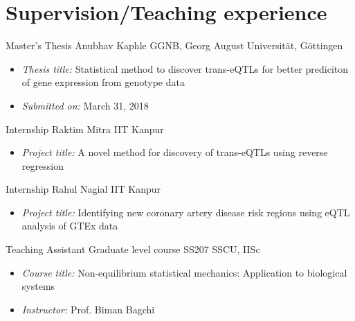 \section{Supervision/Teaching experience}
        {Master's Thesis}
        {Anubhav Kaphle}
        {GGNB, Georg August Universit\"at, G\"ottingen}
        {}
        {\vspace{-1.0em}%
         \begin{itemize}%
         \setlength{\itemsep}{0.35em}
              \item {\itshape\color{color2} Thesis title:} %
                    Statistical method to discover trans-eQTLs for better prediciton of gene expression from genotype data
              \item {\itshape\color{color2} Submitted on:} %
                    March 31, 2018
         \end{itemize}
        }

        {Internship}
        {Raktim Mitra}
        {IIT Kanpur}
        {}
        {\vspace{-1.0em}%
         \begin{itemize}%
         \setlength{\itemsep}{0.35em}
              \item {\itshape\color{color2} Project title:} %
                    A novel method for discovery of trans-eQTLs using reverse regression
         \end{itemize}
        }

        {Internship}
        {Rahul Nagial}
        {IIT Kanpur}
        {}
        {\vspace{-1.0em}%
         \begin{itemize}%
         \setlength{\itemsep}{0.35em}
              \item {\itshape\color{color2} Project title:} %
                    Identifying new coronary artery disease risk regions using eQTL analysis of GTEx data
         \end{itemize}
        }

        {Teaching Assistant}
        {Graduate level course SS207}
        {SSCU, IISc}
        {}
        {\vspace{-1.0em}%
         \begin{itemize}%
         \setlength{\itemsep}{0.35em}
              \item {\itshape\color{color2} Course title:} %
                    Non-equilibrium statistical mechanics: Application to biological systems
              \item {\itshape\color{color2} Instructor:} Prof. Biman Bagchi
         \end{itemize}
        }

